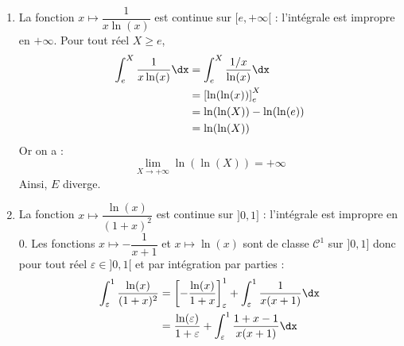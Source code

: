 \documentclass[a4paper,10pt]{report}
\begin{document}
\begin{enumerate}
$$ (x+1)-(x-1) = 2$$
Ainsi, pour tout réel $X \geq 2$,
\begin{align*}
\int_2^{X} \dfrac{1}{(x-1)(x+1)} \dx & = \dfrac{1}{2} \int_2^{X} \dfrac{(x+1)-(x-1)}{(x-1)(x+1)} \dx \\
& = \dfrac{1}{2} \int_2^{X} \dfrac{1}{x-1} - \dfrac{1}{x+1} \dx \\
& = \dfrac{1}{2} \left[ \ln(x-1)-\ln(x+1) \right]_2^X \\
& = \dfrac{1}{2} \left[ \ln \left( \dfrac{x-1}{x+1} \right) \right]_2^X \\
& = \dfrac{1}{2} \ln \left( \dfrac{X-1}{X+1} \right) - \dfrac{1}{2} \ln \left( \dfrac{1}{3} \right) \\
& =  \dfrac{1}{2} \ln \left( \dfrac{X-1}{X+1} \right) + \dfrac{\ln(3)}{2}  \\
\end{align*}
On sait que :
$$ \lim_{X \rightarrow + \infty}  \dfrac{X-1}{X+1} = 1$$
donc par continuité de la fonction logarithme népérien en $1$ :
$$  \lim_{X \rightarrow + \infty} \ln \left( \dfrac{X-1}{X+1} \right) = \ln(1) = 0$$
Ainsi,
$$ \lim_{X \rightarrow + \infty}  \dfrac{1}{2} \ln \left( \dfrac{X-1}{X+1} \right) + \dfrac{\ln(3)}{2}  = \dfrac{\ln(3)}{2}$$
On en déduit que $D$ converge et vaut $\dfrac{\ln(3)}{2} \cdot$
\item La fonction $x \mapsto \dfrac{1}{x\ln(x)}$ est continue sur $[e, + \infty[$ : l'intégrale est impropre en $+ \infty$. Pour tout réel $X \geq e$,
\begin{align*}
\int_{e}^{X} \dfrac{1}{x\ln(x)} \dx & = \int_{e}^{X} \dfrac{1/x}{\ln(x)} \dx \\
& = \left[ \ln(\ln(x)) \right]_e^X \\
& = \ln(\ln(X))- \ln(\ln(e)) \\
& = \ln(\ln(X))
\end{align*}
Or on a :
$$ \lim_{X \rightarrow + \infty} \ln(\ln(X)) = + \infty$$
Ainsi, $E$ diverge.
\item La fonction $x \mapsto \dfrac{\ln(x)}{(1+x)^2}$ est continue sur $]0,1]$ : l'intégrale est impropre en $0$. Les fonctions $x \mapsto - \dfrac{1}{x+1}$ et $x \mapsto \ln(x)$ sont de classe $\mathcal{C}^1$ sur $]0,1]$ donc pour tout réel $\varepsilon \in ]0,1[$ et par intégration par parties :
\begin{align*}
\int_{\varepsilon}^1 \dfrac{\ln(x)}{(1+x)^2} & = \left[- \dfrac{\ln(x)}{1+x} \right]_{\varepsilon}^1 + \int_{\varepsilon}^1 \dfrac{1}{x(x+1)} \dx \\
& = \dfrac{\ln(\varepsilon)}{1+\varepsilon} +\int_{\varepsilon}^1 \dfrac{1+x-1}{x(x+1)} \dx \\

\end{align*}
\end{enumerate}
\end{document}
